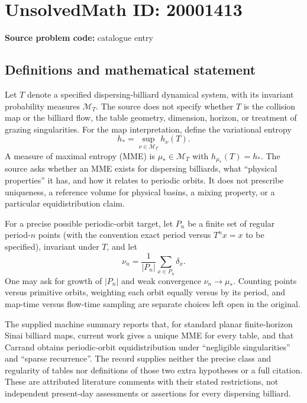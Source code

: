 \documentclass[11pt]{article}
\begin{document}
\section*{UnsolvedMath ID: 20001413}
\textbf{Source problem code:} catalogue entry
\subsection{Definitions and mathematical statement}
Let $T$ denote a specified dispersing-billiard dynamical system, with its invariant probability measures $\mathcal M_T$. The source does not specify whether $T$ is the collision map or the billiard flow, the table geometry, dimension, horizon, or treatment of grazing singularities. For the map interpretation, define the variational entropy
\[
 h_*=\sup_{\nu\in\mathcal M_T}h_\nu(T).
\]
A measure of maximal entropy (MME) is $\mu_*\in\mathcal M_T$ with $h_{\mu_*}(T)=h_*$. The source asks whether an MME exists for dispersing billiards, what ``physical properties'' it has, and how it relates to periodic orbits. It does not prescribe uniqueness, a reference volume for physical basins, a mixing property, or a particular equidistribution claim.

For a precise possible periodic-orbit target, let $P_n$ be a finite set of regular period-$n$ points (with the convention exact period versus $T^nx=x$ to be specified), invariant under $T$, and let
\[
 \nu_n=\frac1{|P_n|}\sum_{x\in P_n}\delta_x.
\]
One may ask for growth of $|P_n|$ and weak convergence $\nu_n\to\mu_*$. Counting points versus primitive orbits, weighting each orbit equally versus by its period, and map-time versus flow-time sampling are separate choices left open in the original.

The supplied machine summary reports that, for standard planar finite-horizon Sinai billiard maps, current work gives a unique MME for every table, and that Carrand obtains periodic-orbit equidistribution under ``negligible singularities'' and ``sparse recurrence''. The record supplies neither the precise class and regularity of tables nor definitions of those two extra hypotheses or a full citation. These are attributed literature comments with their stated restrictions, not independent present-day assessments or assertions for every dispersing billiard.
\end{document}
